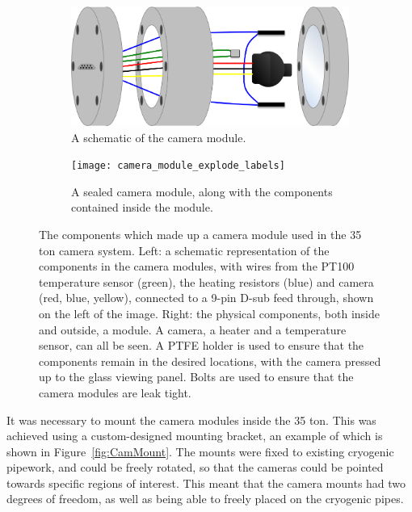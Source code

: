 \begin{figure}
  \centering
  \begin{subfigure}{0.45\textwidth}
    \centering
    \includegraphics[width=\textwidth]{cam_in_housing_diagram}
    \caption{A schematic of the camera module.}
    \label{fig:CamSchem}
  \end{subfigure}
  \hspace{0.08\textwidth}
  \begin{subfigure}{0.45\textwidth}
    \centering
    \texttt{[image: camera\_module\_explode\_labels]}
    \caption{A sealed camera module, along with the components contained inside the module.}
    \label{fig:CamModule}
  \end{subfigure}
  \caption[The components which made up a camera module used in the 35 ton camera system]
          {The components which made up a camera module used in the 35 ton camera system. Left: a schematic representation of the components in the camera modules, with wires from the PT100 temperature sensor (green), the heating resistors (blue) and camera (red, blue, yellow), connected to a 9-pin D-sub feed through, shown on the left of the image. Right: the physical components, both inside and outside, a module. A camera, a heater and a temperature sensor, can all be seen. A PTFE holder is used to ensure that the components remain in the desired locations, with the camera pressed up to the glass viewing panel. Bolts are used to ensure that the camera modules are leak tight.}
\end{figure}

It was necessary to mount the camera modules inside the 35 ton. This was achieved using a custom-designed mounting bracket, an example of which is shown in Figure~\ref{fig:CamMount}. The mounts were fixed to existing cryogenic pipework, and could be freely rotated, so that the cameras could be pointed towards specific regions of interest. This meant that the camera mounts had two degrees of freedom, as well as being able to freely placed on the cryogenic pipes. \\

